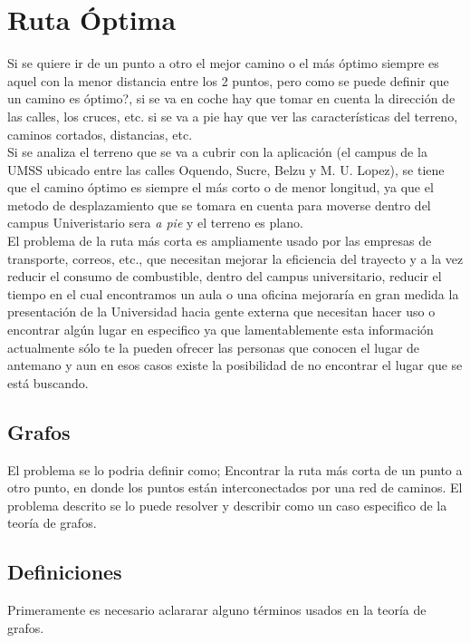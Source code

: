 \chapter{Ruta Óptima} %
\label{cha:ruta_optima}

Si se quiere ir de un punto a otro el mejor camino o el más óptimo siempre es aquel con la menor distancia entre los 2 puntos, pero como se puede definir que un camino es óptimo?, si se va en coche hay que tomar en cuenta la dirección de las calles, los cruces, etc. si se va a pie hay que ver las características del terreno, caminos cortados, distancias, etc.\\


Si se analiza el terreno que se va a cubrir con la aplicación (el campus de la UMSS ubicado entre las calles Oquendo, Sucre,  Belzu y M. U. Lopez), se tiene que el camino óptimo es siempre el más corto o de menor longitud, ya que el metodo de desplazamiento que se tomara en cuenta para moverse dentro del campus Univeristario sera \emph{a pie} y el terreno es plano.\\

El problema de la ruta más corta es ampliamente usado por las empresas de transporte, correos, etc., que necesitan mejorar la eficiencia del trayecto y a la vez reducir el consumo de combustible, dentro del campus universitario, reducir el tiempo en el cual encontramos un aula o una oficina mejoraría en gran medida la presentación de la Universidad hacia gente externa que necesitan hacer uso o encontrar algún lugar en especifico ya que lamentablemente esta información actualmente sólo te la pueden ofrecer las personas que conocen el lugar de antemano y aun en esos casos existe la posibilidad de no encontrar el lugar que se está buscando.\\


  \section{Grafos} %
  \label{sec:teoria_grafos}

    El problema se lo podria definir como; Encontrar la ruta más corta de un punto a otro punto, en donde los puntos están interconectados por una red de caminos. El problema descrito se lo puede resolver y describir como un caso especifico de la teoría de grafos.


    \section{Definiciones} %
    \label{sec:grafos_definiciones}
      Primeramente es necesario aclararar alguno términos usados en la teoría de grafos.

